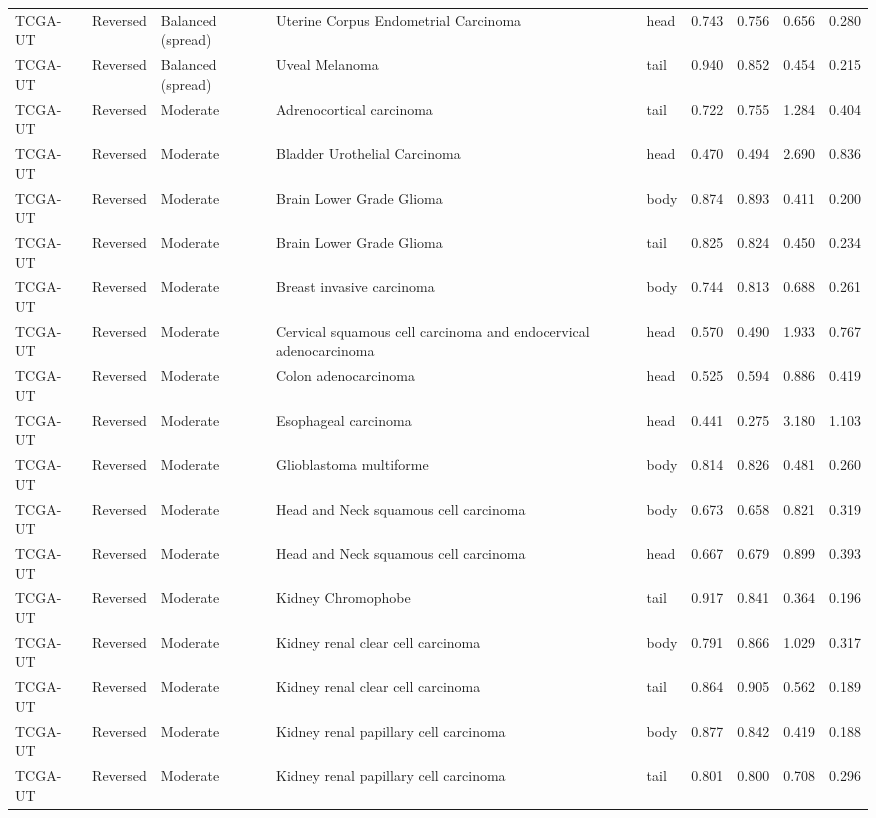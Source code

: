 \begin{longtable}{lllllrrrr}
TCGA-UT & Reversed & Balanced (spread) & Uterine Corpus Endometrial Carcinoma & head & 0.743 & 0.756 & 0.656 & 0.280 \\
TCGA-UT & Reversed & Balanced (spread) & Uveal Melanoma & tail & 0.940 & 0.852 & 0.454 & 0.215 \\
TCGA-UT & Reversed & Moderate & Adrenocortical carcinoma & tail & 0.722 & 0.755 & 1.284 & 0.404 \\
TCGA-UT & Reversed & Moderate & Bladder Urothelial Carcinoma & head & 0.470 & 0.494 & 2.690 & 0.836 \\
TCGA-UT & Reversed & Moderate & Brain Lower Grade Glioma & body & 0.874 & 0.893 & 0.411 & 0.200 \\
TCGA-UT & Reversed & Moderate & Brain Lower Grade Glioma & tail & 0.825 & 0.824 & 0.450 & 0.234 \\
TCGA-UT & Reversed & Moderate & Breast invasive carcinoma & body & 0.744 & 0.813 & 0.688 & 0.261 \\
TCGA-UT & Reversed & Moderate & Cervical squamous cell carcinoma and endocervical adenocarcinoma & head & 0.570 & 0.490 & 1.933 & 0.767 \\
TCGA-UT & Reversed & Moderate & Colon adenocarcinoma & head & 0.525 & 0.594 & 0.886 & 0.419 \\
TCGA-UT & Reversed & Moderate & Esophageal carcinoma & head & 0.441 & 0.275 & 3.180 & 1.103 \\
TCGA-UT & Reversed & Moderate & Glioblastoma multiforme & body & 0.814 & 0.826 & 0.481 & 0.260 \\
TCGA-UT & Reversed & Moderate & Head and Neck squamous cell carcinoma & body & 0.673 & 0.658 & 0.821 & 0.319 \\
TCGA-UT & Reversed & Moderate & Head and Neck squamous cell carcinoma & head & 0.667 & 0.679 & 0.899 & 0.393 \\
TCGA-UT & Reversed & Moderate & Kidney Chromophobe & tail & 0.917 & 0.841 & 0.364 & 0.196 \\
TCGA-UT & Reversed & Moderate & Kidney renal clear cell carcinoma & body & 0.791 & 0.866 & 1.029 & 0.317 \\
TCGA-UT & Reversed & Moderate & Kidney renal clear cell carcinoma & tail & 0.864 & 0.905 & 0.562 & 0.189 \\
TCGA-UT & Reversed & Moderate & Kidney renal papillary cell carcinoma & body & 0.877 & 0.842 & 0.419 & 0.188 \\
TCGA-UT & Reversed & Moderate & Kidney renal papillary cell carcinoma & tail & 0.801 & 0.800 & 0.708 & 0.296 \\

\end{longtable}
